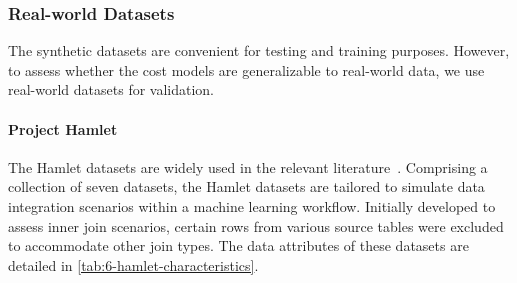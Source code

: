 \subsubsection{Real-world Datasets}
The synthetic datasets are convenient for testing and training purposes. However, to assess whether the cost models are generalizable to real-world data, we use real-world datasets for validation.

\paragraph{Project Hamlet~\cite{2016-hamlet-sigmod}}
The Hamlet datasets are widely used in the relevant literature~\cite{2016-hamlet-sigmod, amalur, morpheus,orion_learning_gen_lin_models}. Comprising a collection of seven datasets, the Hamlet datasets are tailored to simulate data integration scenarios within a machine learning workflow. Initially developed to assess inner join scenarios, certain rows from various source tables were excluded to accommodate other join types. The data attributes of these datasets are detailed in \autoref{tab:6-hamlet-characteristics}.

